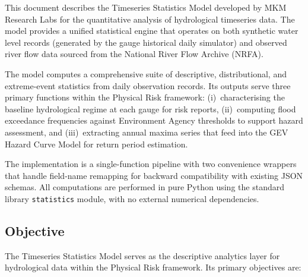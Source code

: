 \documentclass[11pt,a4paper]{article}
\begin{document}
\mkmtitlepage
\mkmlegalpage
\tableofcontents
\clearpage

\mkmexecsummary

This document describes the Timeseries Statistics Model developed by MKM Research Labs for the quantitative analysis of hydrological timeseries data. The model provides a unified statistical engine that operates on both synthetic water level records (generated by the gauge historical daily simulator) and observed river flow data sourced from the National River Flow Archive (NRFA).

The model computes a comprehensive suite of descriptive, distributional, and extreme-event statistics from daily observation records. Its outputs serve three primary functions within the Physical Risk framework: (i)~characterising the baseline hydrological regime at each gauge for risk reports, (ii)~computing flood exceedance frequencies against Environment Agency thresholds to support hazard assessment, and (iii)~extracting annual maxima series that feed into the GEV Hazard Curve Model for return period estimation.

The implementation is a single-function pipeline with two convenience wrappers that handle field-name remapping for backward compatibility with existing JSON schemas. All computations are performed in pure Python using the standard library \texttt{statistics} module, with no external numerical dependencies.

\clearpage

\mkmpurpose

\subsection{Objective}

The Timeseries Statistics Model serves as the descriptive analytics layer for hydrological data within the Physical Risk framework. Its primary objectives are:
\end{document}
